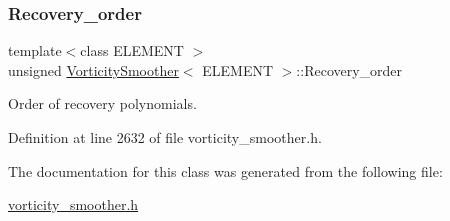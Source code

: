 \subsubsection{\texorpdfstring{Recovery\+\_\+order}{Recovery\_order}}
{\footnotesize\ttfamily template$<$class E\+L\+E\+M\+E\+NT $>$ \\
unsigned \hyperlink{classVorticitySmoother}{Vorticity\+Smoother}$<$ E\+L\+E\+M\+E\+NT $>$\+::Recovery\+\_\+order\hspace{0.3cm}{\ttfamily [private]}}



Order of recovery polynomials. 



Definition at line 2632 of file vorticity\+\_\+smoother.\+h.



The documentation for this class was generated from the following file\+:\begin{DoxyCompactItemize}
\item 
\hyperlink{vorticity__smoother_8h}{vorticity\+\_\+smoother.\+h}\end{DoxyCompactItemize}

